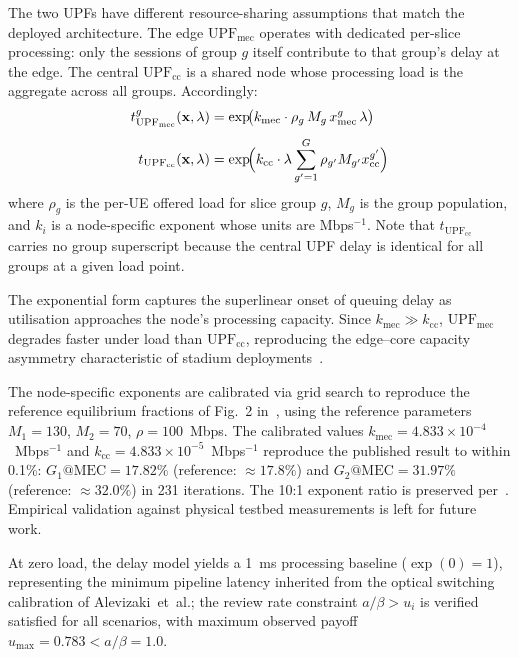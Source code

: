 \documentclass[conference]{IEEEtran}
\begin{document}
The two UPFs have different resource-sharing assumptions
that match the deployed architecture. The edge
$\text{UPF}_\text{mec}$ operates with dedicated
per-slice processing: only the sessions of group $g$
itself contribute to that group's delay at the edge.
The central $\text{UPF}_\text{cc}$ is a shared node
whose processing load is the aggregate across all groups.
Accordingly:
\begin{align}
    t_{\text{UPF}_\text{mec}}^g(\mathbf{x},\lambda)
      &= \exp\!\bigl(k_\text{mec}\cdot
         \rho_g\,M_g\,x_\text{mec}^g\,\lambda\bigr)
    \label{eq:upf_delay_mec} \\[4pt]
    t_{\text{UPF}_\text{cc}}(\mathbf{x},\lambda)
      &= \exp\!\Bigl(k_\text{cc}\cdot\lambda
         \sum_{g'=1}^{G}\rho_{g'} M_{g'}
         x_\text{cc}^{g'}\Bigr)
    \label{eq:upf_delay_cc}
\end{align}
where $\rho_g$ is the per-UE offered load for slice group
$g$, $M_g$ is the group population, and $k_i$ is a
node-specific exponent whose units are Mbps$^{-1}$.
Note that $t_{\text{UPF}_\text{cc}}$ carries no group
superscript because the central UPF delay is identical
for all groups at a given load point.

The exponential form captures the superlinear onset of
queuing delay as utilisation approaches the node's
processing capacity. Since $k_\text{mec} \gg k_\text{cc}$,
$\text{UPF}_\text{mec}$ degrades faster under load than
$\text{UPF}_\text{cc}$, reproducing the edge--core
capacity asymmetry characteristic of stadium
deployments~\cite{nokia_live_events}.

The node-specific exponents are calibrated via grid search
to reproduce the reference equilibrium fractions of Fig.~2
in~\cite{Alevizaki2021upf}, using the reference parameters
$M_1=130$, $M_2=70$, $\rho=100$~Mbps. The calibrated
values $k_\text{mec} = 4.833\times10^{-4}$~Mbps$^{-1}$
and $k_\text{cc} = 4.833\times10^{-5}$~Mbps$^{-1}$
reproduce the published result to within 0.1\%:
$G_1\text{@MEC} = 17.82\%$ (reference: $\approx 17.8\%$)
and $G_2\text{@MEC} = 31.97\%$ (reference: $\approx 32.0\%$)
in 231 iterations. The 10:1 exponent ratio is preserved
per~\cite{Alevizaki2021upf}. Empirical validation against
physical testbed measurements is left for future work.

At zero load, the delay model yields a 1~ms processing baseline
($\exp(0) = 1$), representing the minimum pipeline latency inherited
from the optical switching calibration of Alevizaki~et~al.; the
review rate constraint $a/\beta > u_i$ is verified satisfied for all
scenarios, with maximum observed payoff $u_\text{max} = 0.783
< a/\beta = 1.0$.
\end{document}
